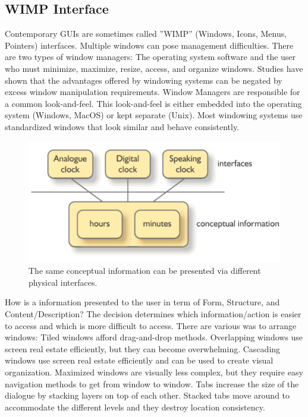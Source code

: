 \subsection{WIMP Interface}
Contemporary GUIs are sometimes called ''WIMP” (Windows, Icons, Menus, Pointers) interfaces. Multiple windows can pose management difficulties. There are two types of window managers: The operating system software and the user who must minimize, maximize, resize, access, and organize windows. Studies have shown that the advantages offered by windowing systems can be negated by excess window manipulation requirements.
Window Managers are responsible for a common look-and-feel. This look-and-feel is either embedded into the operating system (Windows, MacOS) or kept separate (Unix). Most windowing systems use standardized windows that look similar and behave consistently.\\
\begin{figure}[h!]
	\centering
	\includegraphics[width=.4\textwidth]{img/ch07_con.png}
	\caption{The same conceptual information can be presented via different physical interfaces.}
	\label{con}
\end{figure}
How is a information presented to the user in term of Form, Structure, and Content/Description? The decision determines which information/action is easier to access and which is more difficult to access. There are various was to arrange windows: Tiled windows afford drag-and-drop methods. Overlapping windows use screen real estate efficiently, but they can become overwhelming. Cascading windows use screen real estate efficiently and can be used to create visual organization. Maximized windows are visually less complex, but they require easy navigation methods to get from window to window. Tabs increase the size of the dialogue by stacking layers on top of each other. Stacked tabs move around to accommodate the different levels and they destroy location consistency.
